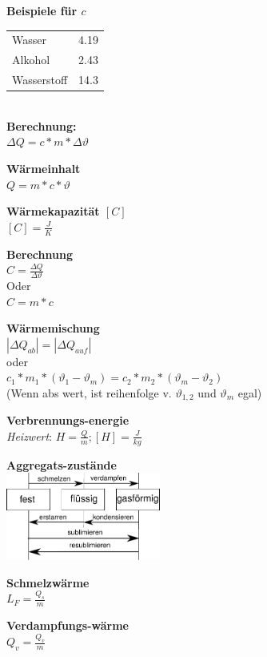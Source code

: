 \documentclass[a4paper,9pt]{article}
\begin{document}
\begin{multicols}{4}
\textbf{Beispiele für $ c $}\\ 
	  \begin{tabular}{ll}
	  	Wasser & 4.19 \\
	  	Alkohol & 2.43 \\
	  	Wasserstoff & 14.3
	  \end{tabular}\\
	  
	  

\textbf{Berechnung:}\\
	  $ \Delta Q = c * m * \Delta \vartheta $
	  
	  

\textbf{Wärmeinhalt}\\
	  $ Q = m * c * \vartheta $
	  

\textbf{Wärmekapazität $[C]$}\\
	  
	  $ [C] = \frac{J}{K} $
	  
	  

\textbf{Berechnung}\\
	  $ C = \frac{\Delta Q}{\Delta \vartheta} $\\
	  
	  Oder \\
	  
	  $ C = m * c $
	  
	  

\textbf{Wärmemischung}\\
	  
	  $ |\Delta Q_{ab}| = | \Delta Q_{auf} | $\\
	  oder\\
	  $c_1 * m_1  * (\vartheta_1 - \vartheta_m) = c_2 * m_2 * (\vartheta_m - \vartheta_2) $\\
	  (Wenn abs wert, ist reihenfolge v. $ \vartheta_{1,2}$ und $ \vartheta_m $ egal)
	  
	  

\textbf{Verbrennungs-energie}\\
	  
	  \textit{Heizwert}: $ H = \frac{Q}{m}; [H] = \frac{J}{kg} $
	  

\textbf{Aggregats-zustände}\\
	  
	  \includegraphics[width=2in]{agregat}
	  
	  

\textbf{Schmelzwärme}\\
	  
	  $ L_F = \frac{Q_s}{m} $
	  
	  

\textbf{Verdampfungs-wärme}\\
	  
	  $ Q_v = \frac{Q_v}{m} $
          
	
	
\end{multicols}	
\end{document}

